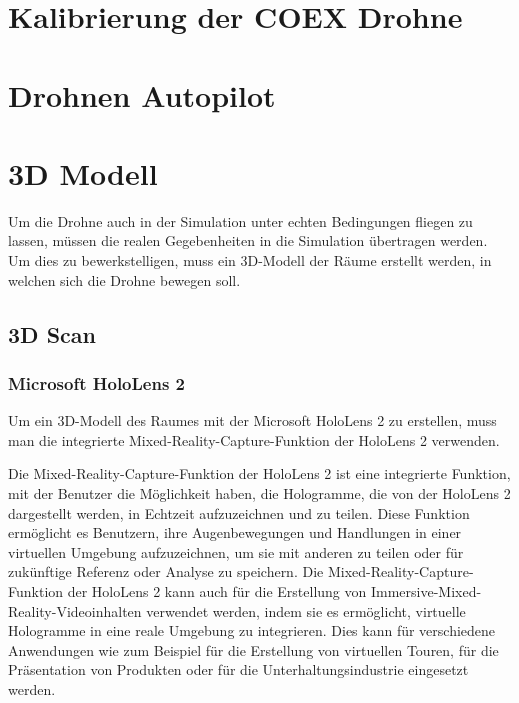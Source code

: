 \section{Kalibrierung der COEX Drohne} \label{kalibrierung_coex__drohne:subsection}

\section{Drohnen Autopilot} \label{drohnen_autopilot:subsection}


\section{3D Modell} \label{3d_modell:section}
Um die Drohne auch in der Simulation unter echten Bedingungen fliegen zu lassen, müssen die realen Gegebenheiten in die Simulation übertragen werden. Um dies zu bewerkstelligen, muss ein 3D-Modell der Räume erstellt werden, in welchen sich die Drohne bewegen soll.
    \subsection{3D Scan} \label{3d-scan:subsection}

        \subsubsection{Microsoft HoloLens 2} \label{hololens:subsubsection}
        Um ein 3D-Modell des Raumes mit der Microsoft HoloLens 2 zu erstellen, muss man die integrierte Mixed-Reality-Capture-Funktion der HoloLens 2 verwenden.
        
        Die Mixed-Reality-Capture-Funktion der HoloLens 2 ist eine integrierte Funktion, mit der Benutzer die Möglichkeit haben, die Hologramme, die von der HoloLens 2 dargestellt werden, in Echtzeit aufzuzeichnen und zu teilen. Diese Funktion ermöglicht es Benutzern, ihre Augenbewegungen und Handlungen in einer virtuellen Umgebung aufzuzeichnen, um sie mit anderen zu teilen oder für zukünftige Referenz oder Analyse zu speichern. Die Mixed-Reality-Capture-Funktion der HoloLens 2 kann auch für die Erstellung von Immersive-Mixed-Reality-Videoinhalten verwendet werden, indem sie es ermöglicht, virtuelle Hologramme in eine reale Umgebung zu integrieren. Dies kann für verschiedene Anwendungen wie zum Beispiel für die Erstellung von virtuellen Touren, für die Präsentation von Produkten oder für die Unterhaltungsindustrie eingesetzt werden.
        
